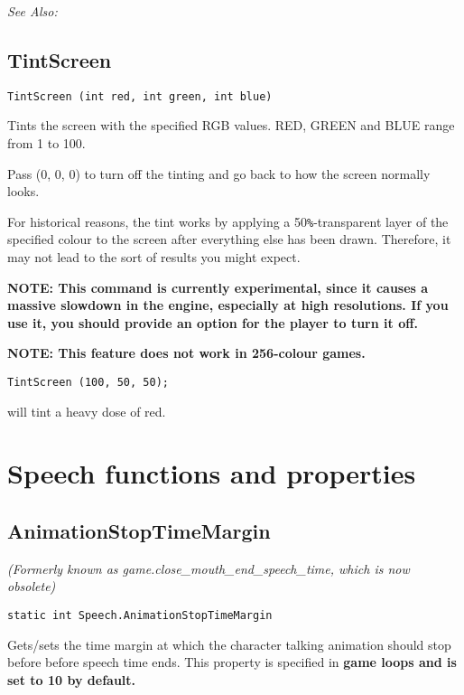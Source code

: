 \it{See Also:} 


\subsection{TintScreen}\label{TintScreen}%

\begin{verbatim}
TintScreen (int red, int green, int blue)
\end{verbatim}
Tints the screen with the specified RGB values. RED, GREEN and BLUE range
from 1 to 100.

Pass (0, 0, 0) to turn off the tinting and go back to how the screen
normally looks.

For historical reasons, the tint works by applying a 50\verb$%$-transparent layer
of the specified colour to the screen after everything else has been drawn.
Therefore, it may not lead to the sort of results you might expect.

\bf{NOTE:} This command is currently experimental, since it causes a massive
slowdown in the engine, especially at high resolutions. If you use it, you
should provide an option for the player to turn it off.

\bf{NOTE:} This feature does not work in 256-colour games.

\begin{verbatim}
TintScreen (100, 50, 50);
\end{verbatim}
will tint a heavy dose of red.


\section{Speech functions and properties}\label{SpeechCommands}%

\subsection{AnimationStopTimeMargin}\label{Speech.AnimationStopTimeMargin}%

\it{(Formerly known as game.close_mouth_end_speech_time, which is now obsolete)}

\begin{verbatim}
static int Speech.AnimationStopTimeMargin
\end{verbatim}

Gets/sets the time margin at which the character talking animation should stop before before speech time ends.
This property is specified in \bf{game loops} and is set to 10 by default.

